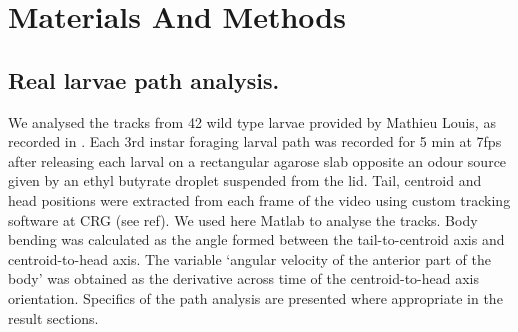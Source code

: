 \documentclass[10pt,a4paper]{article}
\begin{document}
\section{Materials And Methods}
\subsection{Real larvae path analysis.}
We analysed the tracks from 42 wild type larvae provided by Mathieu Louis, as recorded in \cite{gomez2011active}. Each 3rd instar foraging larval path was recorded for 5 min at 7fps after releasing each larval on a rectangular agarose slab opposite an odour source given by an ethyl butyrate droplet suspended from the lid. Tail, centroid and head positions were extracted from each frame of the video using custom tracking software at CRG (see ref). We used here Matlab to analyse the tracks. Body bending was calculated as the angle formed between the tail-to-centroid axis and centroid-to-head axis. The variable ‘angular velocity of the anterior part of the body’ was obtained as the derivative across time of the centroid-to-head axis orientation. Specifics of the path analysis are presented where appropriate in the result sections. 
\end{document}
